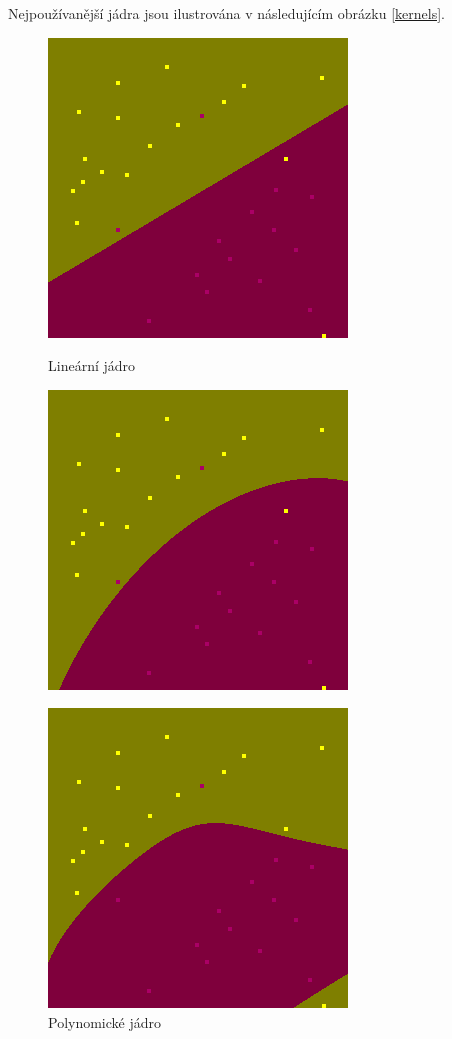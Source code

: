Nejpoužívanější jádra jsou ilustrována v následujícím obrázku \ref{kernels}.
\begin{figure}[ht] 
  \begin{minipage}[b]{0.5\linewidth}
    \centering
    \includegraphics[width=.6\linewidth]{figures/linear} 
    \caption*{Lineární jádro} 
    \vspace{4ex}
    \label{linearKernel} 
  \end{minipage}%
  \begin{minipage}[b]{0.5\linewidth}
    \centering
    \includegraphics[width=.6\linewidth]{figures/poly} 
    \caption*{Polynomické jádro} 
    \vspace{4ex}
    \label{polyKernel} 
  \end{minipage} 
  \begin{minipage}[b]{0.5\linewidth}
    \centering
    \includegraphics[width=.6\linewidth]{figures/rbf} 

\end{minipage}
\end{figure}
